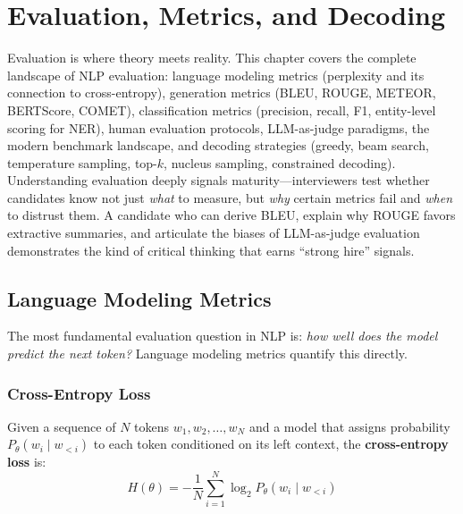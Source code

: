 
\chapter{Evaluation, Metrics, and Decoding}
\label{chap:evaluation}

\begin{tldr}
Evaluation is where theory meets reality.  This chapter covers the complete landscape of
NLP evaluation: language modeling metrics (perplexity and its connection to cross-entropy),
generation metrics (BLEU, ROUGE, METEOR, BERTScore, COMET), classification metrics
(precision, recall, F1, entity-level scoring for NER), human evaluation protocols,
LLM-as-judge paradigms, the modern benchmark landscape, and decoding strategies
(greedy, beam search, temperature sampling, top-$k$, nucleus sampling, constrained
decoding).  Understanding evaluation deeply signals maturity---interviewers test whether
candidates know not just \emph{what} to measure, but \emph{why} certain metrics fail and
\emph{when} to distrust them.  A candidate who can derive BLEU, explain why ROUGE
favors extractive summaries, and articulate the biases of LLM-as-judge evaluation
demonstrates the kind of critical thinking that earns ``strong hire'' signals.
\end{tldr}

\bigskip

\section{Language Modeling Metrics}
\label{sec:lm_metrics}

The most fundamental evaluation question in NLP is: \emph{how well does the model
predict the next token?}  Language modeling metrics quantify this directly.

\subsection{Cross-Entropy Loss}

Given a sequence of $N$ tokens $w_1, w_2, \ldots, w_N$ and a model that assigns
probability $P_\theta(w_i \mid w_{<i})$ to each token conditioned on its left
context, the \textbf{cross-entropy loss} is:
\[
    H(\theta) = -\frac{1}{N} \sum_{i=1}^{N} \log_2 P_\theta(w_i \mid w_{<i})
\]

